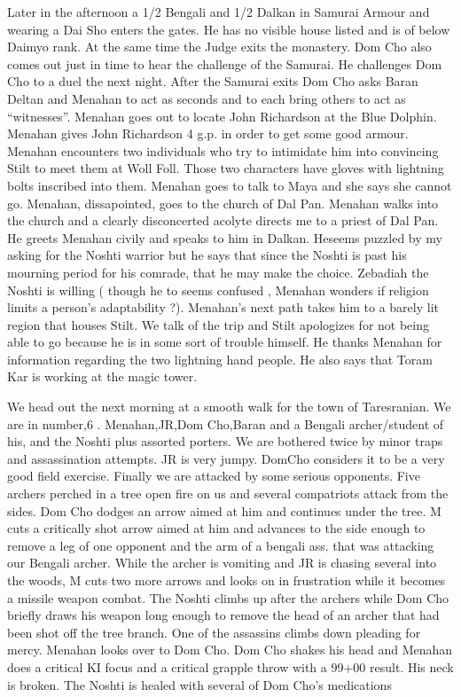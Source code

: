 \documentclass[10pt]{report}
\begin{document}
Later in the afternoon a 1/2 Bengali and 1/2 Dalkan in Samurai Armour
and wearing a Dai Sho enters the gates. He has no visible house listed and
is of below Daimyo rank. At the same time the Judge exits the monastery.
Dom Cho also comes out just in time to hear the challenge of the Samurai.
He challenges Dom Cho to a duel the next night. After the Samurai exits
Dom Cho asks Baran Deltan and Menahan to act as seconds and to each bring
others to act as ``witnesses''. Menahan goes out to locate John
Richardson at the Blue Dolphin. Menahan gives John Richardson 4 g.p. in
order to get some good armour. Menahan encounters two individuals who try to intimidate him
into convincing Stilt to meet them at Woll Foll. Those two characters have
gloves with lightning bolts inscribed into them. Menahan goes to talk to Maya
and she says she cannot go. Menahan, dissapointed, goes to the church of Dal Pan.
Menahan walks into the church and a clearly disconcerted acolyte directs
me to a priest of Dal Pan. He greets Menahan civily and speaks to him
in Dalkan. Heseems puzzled by my asking for the Noshti warrior but he says that since
the Noshti is past his mourning period for his comrade, that he may make
the choice. Zebadiah the Noshti is willing ( though he to seems confused ,
Menahan wonders if religion limits a person's adaptability ?). Menahan's
next path takes him to a barely lit region that houses Stilt. We
talk of the trip and Stilt apologizes for not being able to go because he is in some sort
of trouble himself. He thanks Menahan for information regarding the two
lightning hand people. He also says that Toram Kar is working at the magic
tower.

We head out the next morning at a smooth walk for the town of Taresranian.
We are in number,6 . Menahan,JR,Dom Cho,Baran and a Bengali archer/student
of his, and the Noshti plus assorted porters. We are bothered twice by
minor traps and assassination attempts. JR is very jumpy. DomCho considers
it to be a very good field exercise. Finally we are attacked by some
serious opponents. Five archers perched in a tree open fire on us and
several compatriots attack from the sides. Dom Cho dodges an arrow aimed
at him and continues under the tree. M cuts a critically shot arrow aimed
at him and advances to the side enough to remove a leg of one opponent and
the arm of a bengali ass. that was attacking our Bengali archer. While the
archer is vomiting and JR is chasing several into the woods, M cuts two
more arrows and looks on in frustration while it becomes a missile weapon
combat. The Noshti climbs up after the archers while Dom Cho briefly draws
his weapon long enough to remove the head of an archer that had been shot
off the tree branch. One of the assassins climbs down pleading for mercy.
Menahan looks over to Dom Cho. Dom Cho shakes his head and Menahan does a
critical KI focus and a critical grapple throw with a 99+00 result. His
neck is broken. The Noshti is healed with several of Dom Cho's medications
\end{document}
